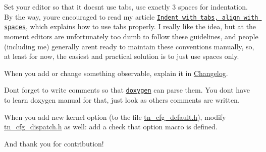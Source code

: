 \begin{DoxyItemize}
\item Set your editor so that it doesn\textquotesingle{}t use tabs, use exactly 3 spaces for indentation. By the way, you\textquotesingle{}re encouraged to read my article \href{http://dmitryfrank.com/articles/indent_with_tabs_align_with_spaces}{\tt Indent with tabs, align with spaces}, which explains how to use tabs properly. I really like the idea, but at the moment editors are unfortunately too dumb to follow these guidelines, and people (including me) generally aren\textquotesingle{}t ready to maintain these conventions manually, so, at least for now, the easiest and practical solution is to just use spaces only.
\item When you add or change something observable, explain it in \hyperlink{changelog}{Changelog}.
\item Don\textquotesingle{}t forget to write comments so that \href{http://www.stack.nl/~dimitri/doxygen/}{\tt doxygen} can parse them. You don\textquotesingle{}t have to learn doxygen manual for that, just look as others comments are written.
\item When you add new kernel option (to the file {\ttfamily \hyperlink{tn__cfg__default_8h}{tn\+\_\+cfg\+\_\+default.\+h}}), modify {\ttfamily \hyperlink{tn__cfg__dispatch_8h}{tn\+\_\+cfg\+\_\+dispatch.\+h}} as well\+: add a check that option macro is defined.
\end{DoxyItemize}

And thank you for contribution! 